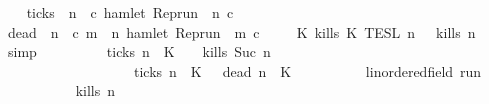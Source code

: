 \begin{isabellebody}
\ \ \isamarkupfalse%
\ {\isacharquery}ticks\ {\isacharequal}\ {\isacartoucheopen}{\isasymlambda}n\ {\isasymrho}\ c{\isachardot}\ hamlet\ {\isacharparenleft}{\isacharparenleft}Rep{\isacharunderscore}run\ {\isasymrho}{\isacharparenright}\ n\ c{\isacharparenright}{\isacartoucheclose}\isanewline
\ \ \isamarkupfalse%
\ {\isacharquery}dead\ {\isacharequal}\ {\isacartoucheopen}{\isasymlambda}n\ {\isasymrho}\ c{\isachardot}\ {\isasymforall}m\ {\isasymge}\ n{\isachardot}\ {\isasymnot}hamlet\ {\isacharparenleft}{\isacharparenleft}Rep{\isacharunderscore}run\ {\isasymrho}{\isacharparenright}\ m\ c{\isacharparenright}{\isacartoucheclose}\isanewline
\ \ \isamarkupfalse%
\ {\isacartoucheopen}{\isasymlbrakk}\ K\ kills\ K\ {\isasymrbrakk}\isactrlsub T\isactrlsub E\isactrlsub S\isactrlsub L\isactrlbsup {\isasymge}\ n\isactrlesup \ {\isacharequal}\ {\isacharbraceleft}{\isasymrho}{\isachardot}\ {\isacharquery}kills\ n\ {\isasymrho}{\isacharbraceright}{\isacartoucheclose}\ \isamarkupfalse%
\ simp\isanewline
\ \ \isamarkupfalse%
\ \isamarkupfalse%
\ {\isacartoucheopen}{\isachardot}{\isachardot}{\isachardot}\ {\isacharequal}\ {\isacharparenleft}{\isacharbraceleft}{\isasymrho}{\isachardot}\ {\isasymnot}\ {\isacharquery}ticks\ n\ {\isasymrho}\ K\ \ {\isasyminter}\ {\isacharbraceleft}{\isasymrho}{\isachardot}\ {\isacharquery}kills\ {\isacharparenleft}Suc\ n{\isacharparenright}\ {\isasymrho}{\isacharbraceright}{\isacharparenright}\isanewline
\ \ \ \ \ \ \ \ \ \ \ \ \ \ \ \ \ {\isasymunion}\ {\isacharparenleft}{\isacharbraceleft}{\isasymrho}{\isachardot}\ {\isacharquery}ticks\ n\ {\isasymrho}\ K\ {\isasyminter}\ {\isacharbraceleft}{\isasymrho}{\isachardot}\ {\isacharquery}dead\ n\ {\isasymrho}\ K\isanewline
\ \ \isamarkupfalse%
\isanewline
\ \ \ \ \isacommand{{\isacharbraceleft}}\isamarkupfalse%
\ \isamarkupfalse%
\ {\isasymrho}{\isacharcolon}{\isacharcolon}{\isacartoucheopen}{\isacharprime}{\isasymtau}{\isacharcolon}{\isacharcolon}linordered{\isacharunderscore}field\ run{\isacartoucheclose}\isanewline
\ \ \ \ \ \ \isamarkupfalse%
\ {\isacartoucheopen}{\isasymrho}\ {\isasymin}\ {\isacharbraceleft}{\isasymrho}{\isachardot}\ {\isacharquery}kills\ n\ {\isasymrho}{\isacharbraceright}{\isacartoucheclose}\isanewline

\end{isabellebody}
